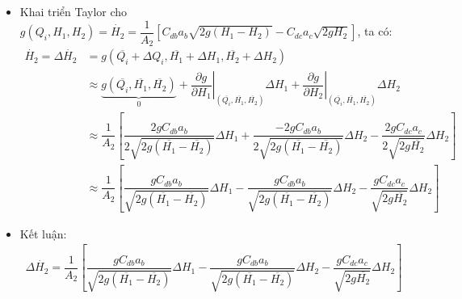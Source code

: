 \begin{enumerate}[\it a.]
\begin{itemize}
\begin{itemize}
                        \item Khai triển Taylor cho $g\left({Q_i, H_1, H_2}\right) = \dot{H_2} = \dfrac{1}{A_2} \left[{C_{db}a_b\sqrt{2g(H_1 - H_2)} - C_{dc}a_c\sqrt{2gH_2}}\right]$, ta có:
                            \begin{align}
                                \dot{H_2} = \Delta \dot{H_2} & = g\left({\overline{Q_i} + \Delta Q_i, \overline{H_1} + \Delta H_1, \overline{H_2} + \Delta H_2}\right) \\
                                & \approx \underbrace{g\left({\overline{Q_i}, \overline{H_1}, \overline{H_2}}\right)}_{0} + \left.\dfrac{\partial g}{\partial H_1}\right|_{\left({\overline{Q_i}, \overline{H_1}, \overline{H_2}}\right)} \Delta H_1 + \left.\dfrac{\partial g}{\partial H_2}\right|_{\left({\overline{Q_i}, \overline{H_1}, \overline{H_2}}\right)} \Delta H_2\\
                                & \approx \dfrac{1}{A_2} \left[{\dfrac{2g C_{db}a_b}{2 \sqrt{2g(\overline{H_1} - \overline{H_2})}} \Delta H_1 + \dfrac{-2g C_{db}a_b}{2 \sqrt{2g(\overline{H_1} - \overline{H_2})}} \Delta H_2 - \dfrac{2g C_{dc}a_c}{2 \sqrt{2g\overline{H_2}}} \Delta H_2}\right]\\
                                & \approx \dfrac{1}{A_2} \left[{\dfrac{g C_{db}a_b}{\sqrt{2g(\overline{H_1} - \overline{H_2})}} \Delta H_1 - \dfrac{g C_{db}a_b}{\sqrt{2g(\overline{H_1} - \overline{H_2})}} \Delta H_2 - \dfrac{g C_{dc}a_c}{\sqrt{2g\overline{H_2}}} \Delta H_2}\right]
                            \end{align}

                        \item Kết luận:
                            \begin{align}
                                \Delta \dot{H_2} = \dfrac{1}{A_2} \left[{\dfrac{g C_{db}a_b}{\sqrt{2g(\overline{H_1} - \overline{H_2})}} \Delta H_1 - \dfrac{g C_{db}a_b}{\sqrt{2g(\overline{H_1} - \overline{H_2})}} \Delta H_2 - \dfrac{g C_{dc}a_c}{\sqrt{2g\overline{H_2}}} \Delta H_2}\right]
                            \end{align}
                    \end{itemize}


\end{itemize}
\end{enumerate}
